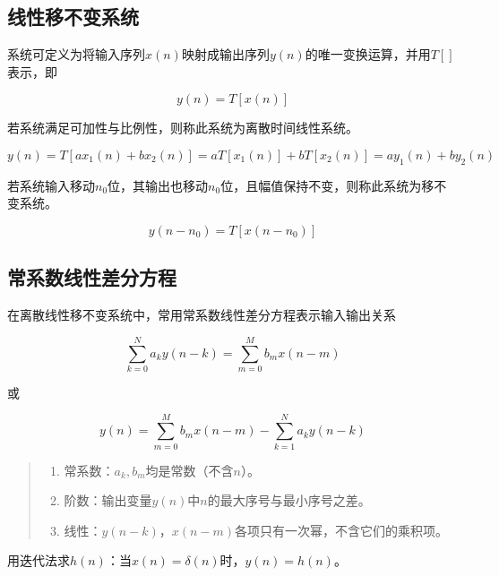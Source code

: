 \documentclass[cn, hazy, blue, normal, 12pt]{elegantnote}
\begin{document}
\subsection{线性移不变系统}

系统可定义为将输入序列$x(n)$映射成输出序列$y(n)$的唯一变换运算，并用$T[]$表示，即

\begin{equation}
        y(n)=T[x(n)]
\end{equation}

若系统满足可加性与比例性，则称此系统为离散时间线性系统。

\begin{equation}
        y(n)=T[ax_1(n)+bx_2(n)]=aT[x_1(n)]+bT[x_2(n)]=ay_1(n)+by_2(n)
\end{equation}

若系统输入移动$n_0$位，其输出也移动$n_0$位，且幅值保持不变，则称此系统为移不变系统。

\begin{equation}
        y(n-n_0)=T[x(n-n_0)]
\end{equation}

\subsection{常系数线性差分方程}

在离散线性移不变系统中，常用常系数线性差分方程表示输入输出关系

\begin{equation}
        \sum_{k=0}^{N}{a_k y(n-k)}=\sum_{m=0}^{M}{b_m x(n-m)}
\end{equation}

或

\begin{equation}
        y(n)=\sum_{m=0}^{M}{b_m x(n-m)}-\sum_{k=1}^{N}{a_k y(n-k)}
\end{equation}

\begin{quote}
\begin{enumerate}
    \item 常系数：$a_k, b_m$均是常数（不含$n$）。
    \item 阶数：输出变量$y(n)$中$n$的最大序号与最小序号之差。
    \item 线性：$y(n-k)$，$x(n-m)$各项只有一次幂，不含它们的乘积项。
\end{enumerate}
\end{quote}

用迭代法求$h(n)$：当$x(n)=\delta(n)$时，$y(n)=h(n)$。
\end{document}

